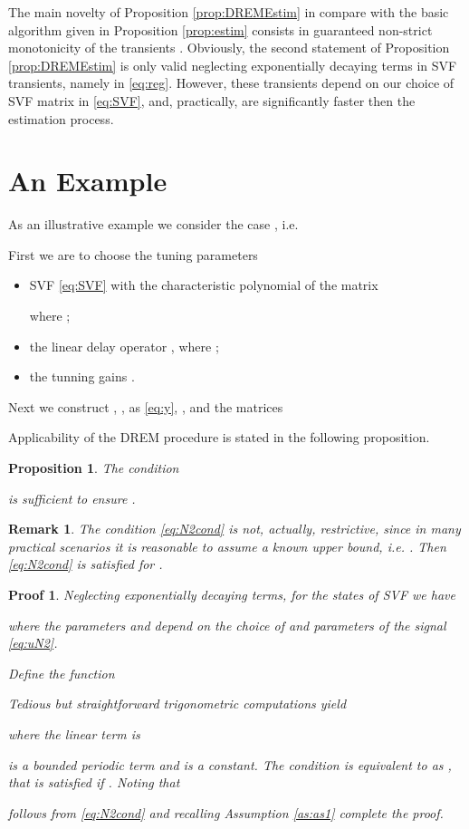 \documentclass[journal, onecolumn]{IEEEtran}
\newtheorem{remark}{Remark}
\newtheorem{prop}{Proposition}
\newtheorem{pf}{Proof}
\begin{document}
The main novelty of Proposition \ref{prop:DREMEstim} in compare with the basic algorithm given in Proposition \ref{prop:estim} consists in guaranteed non-strict monotonicity of the transients . Obviously, the second statement of Proposition \ref{prop:DREMEstim} is only valid neglecting exponentially decaying terms in SVF transients, namely  in \eqref{eq:reg}. However, these transients depend on our choice of SVF matrix  in \eqref{eq:SVF}, and, practically, are significantly faster then the estimation process.
\section{An Example} \label{sec:sim}
As an illustrative example we consider the case , i.e.

First we are to choose the tuning parameters
\begin{itemize}
\item SVF \eqref{eq:SVF} with the characteristic polynomial of the matrix 

where ;
\item the linear delay operator , where ;
\item the tunning gains . 
\end{itemize}

Next we construct ,  ,  as \eqref{eq:y}, , and the matrices




Applicability of the DREM procedure is stated in the following proposition.
\begin{prop} \label{prop:delN2}
The condition

is sufficient to ensure .\end{prop}
\begin{remark}
The condition \eqref{eq:N2cond} is not, actually, restrictive, since in many practical scenarios it is reasonable to assume a known upper bound, i.e.  . Then \eqref{eq:N2cond} is satisfied for .
\end{remark}
\begin{pf}
Neglecting exponentially decaying terms, for the states of SVF we have

where the parameters  and  depend on the choice of  and parameters of the signal \eqref{eq:uN2}.

Define the function

Tedious but straightforward trigonometric computations yield
 
where the \emph{linear} term is

 is a bounded periodic term and  is a constant. The condition  is equivalent to  as , that is satisfied if . Noting that 

follows from \eqref{eq:N2cond} and recalling Assumption \ref{as:as1} complete the proof. \end{pf}
\end{document}
